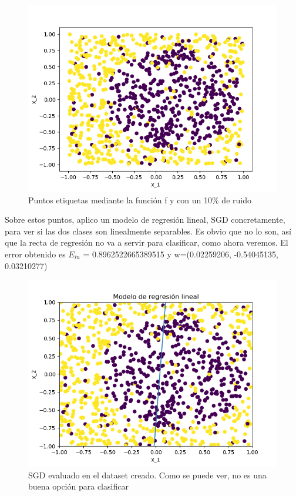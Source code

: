 \begin{figure}[H] %
	\centering
	\includegraphics[scale=0.6]{puntos2.png}  %
	\caption{Puntos etiquetas mediante la función f y con un 10\% de ruido} 
	\label{fig:puntos2D-et}
\end{figure}
 
Sobre estos puntos, aplico un modelo de regresión lineal, SGD concretamente, para ver si las dos clases son linealmente separables. Es obvio que no lo son, así que la recta de regresión no va a servir para clasificar, como ahora veremos. El error obtenido es $E_{in}$ = 0.8962522665389515 y w=(0.02259206, -0.54045135, 0.03210277)

\begin{figure}[H] %
	\centering
	\includegraphics[scale=0.6]{sgd-puntos.png}  %
	\caption{SGD evaluado en el dataset creado. Como se puede ver, no es una buena opción para clasificar} 
	\label{fig:sgd-p}
\end{figure}

